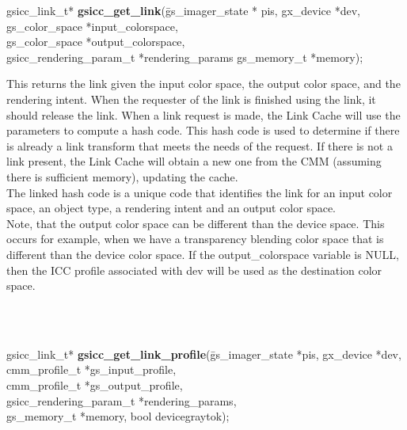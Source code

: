 \documentclass[12pt,notitlepage]{article}
\begin{document}
\begin{tabbing}
\noindent gsicc\_link\_t* {\bf gsicc\_get\_link}(\=gs\_imager\_state * pis, gx\_device *dev, gs\_color\_space  *input\_colorspace,\\
                                               \>gs\_color\_space *output\_colorspace,\\
                                               \> gsicc\_rendering\_param\_t *rendering\_params
                                               gs\_memory\_t
                                               *memory);\\
\end{tabbing}

\begin{minipage}[h]{6.0in}
This returns the link given the input color space, the output color space, and the rendering intent.   When the requester of the link is finished using the link, it should release the link.  When a link request is made, the Link Cache will use the parameters to compute a hash code.  This hash code is used to determine if there is already a link transform that meets the needs of the request.  If there is not a link present, the Link Cache will obtain a new one from the CMM (assuming there is sufficient memory), updating the cache.\\

The linked hash code is a unique code that identifies the link for an input color space, an object type, a rendering intent and an output color space.\\

Note, that the output color space can be different than the device space.  This occurs for example, when we have a transparency blending color space that is different than the device color space.  If the output\_colorspace variable is NULL, then the ICC profile associated with dev will be used as the destination color space.
\end{minipage}\\
\\

\begin{tabbing}
\noindent gsicc\_link\_t* {\bf gsicc\_get\_link\_profile}(\=gs\_imager\_state *pis, gx\_device *dev,\\
\> cmm\_profile\_t *gs\_input\_profile, \\
\> cmm\_profile\_t *gs\_output\_profile, \\
\> gsicc\_rendering\_param\_t *rendering\_params,\\
\> gs\_memory\_t *memory, bool devicegraytok);\\
\end{tabbing}
\end{document}
